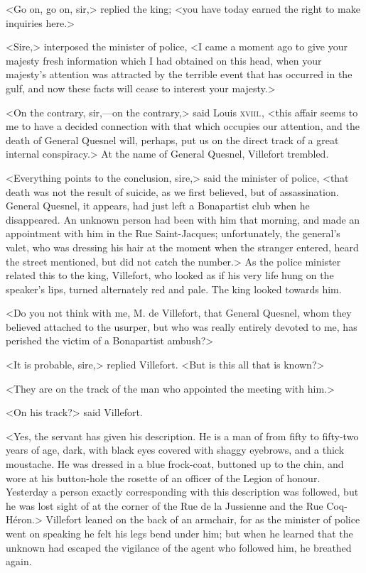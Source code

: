  <Go on, go on, sir,> replied the king; <you have today earned the right to make inquiries here.> 

 <Sire,> interposed the minister of police, <I came a moment ago to give your majesty fresh information which I had obtained on this head, when your majesty's attention was attracted by the terrible event that has occurred in the gulf, and now these facts will cease to interest your majesty.> 

 <On the contrary, sir,—on the contrary,> said Louis \textsc{xviii.}, <this affair seems to me to have a decided connection with that which occupies our attention, and the death of General Quesnel will, perhaps, put us on the direct track of a great internal conspiracy.> At the name of General Quesnel, Villefort trembled. 

 <Everything points to the conclusion, sire,> said the minister of police, <that death was not the result of suicide, as we first believed, but of assassination. General Quesnel, it appears, had just left a Bonapartist club when he disappeared. An unknown person had been with him that morning, and made an appointment with him in the Rue Saint-Jacques; unfortunately, the general's valet, who was dressing his hair at the moment when the stranger entered, heard the street mentioned, but did not catch the number.> As the police minister related this to the king, Villefort, who looked as if his very life hung on the speaker's lips, turned alternately red and pale. The king looked towards him. 

 <Do you not think with me, M. de Villefort, that General Quesnel, whom they believed attached to the usurper, but who was really entirely devoted to me, has perished the victim of a Bonapartist ambush?> 

 <It is probable, sire,> replied Villefort. <But is this all that is known?> 

 <They are on the track of the man who appointed the meeting with him.> 

 <On his track?> said Villefort. 

 <Yes, the servant has given his description. He is a man of from fifty to fifty-two years of age, dark, with black eyes covered with shaggy eyebrows, and a thick moustache. He was dressed in a blue frock-coat, buttoned up to the chin, and wore at his button-hole the rosette of an officer of the Legion of honour. Yesterday a person exactly corresponding with this description was followed, but he was lost sight of at the corner of the Rue de la Jussienne and the Rue Coq-Héron.> Villefort leaned on the back of an armchair, for as the minister of police went on speaking he felt his legs bend under him; but when he learned that the unknown had escaped the vigilance of the agent who followed him, he breathed again. 

